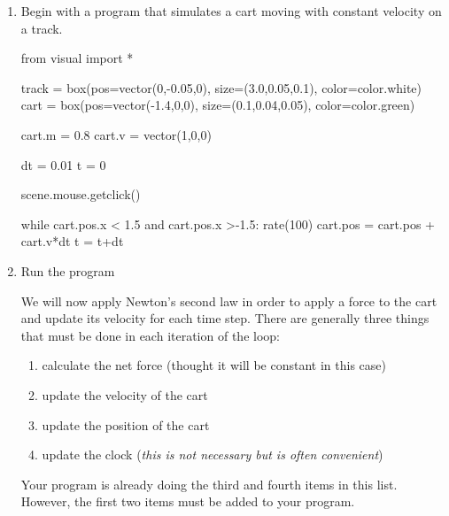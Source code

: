 \begin{enumerate}
	\item Begin with a program that simulates a cart moving with constant velocity on a track.
	
\begin{vpythonblock}
from visual import *

track = box(pos=vector(0,-0.05,0), size=(3.0,0.05,0.1), color=color.white)
cart = box(pos=vector(-1.4,0,0), size=(0.1,0.04,0.05), color=color.green)

cart.m = 0.8
cart.v = vector(1,0,0)

dt = 0.01
t = 0

scene.mouse.getclick()

while cart.pos.x < 1.5 and cart.pos.x >-1.5:
	rate(100)
	cart.pos = cart.pos + cart.v*dt
	t = t+dt
\end{vpythonblock}

	\item Run the program







We will now apply Newton's second law in order to apply a force to the cart and update its velocity for each time step. There are generally three things that must be done in each iteration of the loop:
	
	\begin{enumerate}
		\item calculate the net force (thought it will be constant in this case)
		\item update the velocity of the cart
		\item update the position of the cart
		\item update the clock (\emph{this is not necessary but is often convenient})
	\end{enumerate}

Your program is already doing the third and fourth items in this list. However, the first two items must be added to your program.


\end{enumerate}

